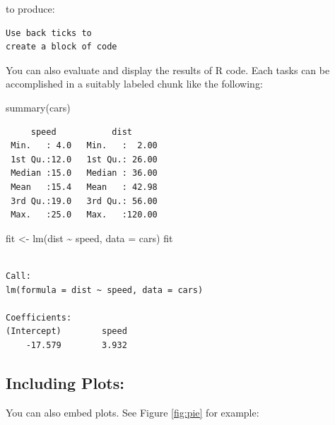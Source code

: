 \documentclass[
]{book}
\newenvironment{Shaded}{\begin{snugshade}}{\end{snugshade}}
\newcommand{\AttributeTok}[1]{\textcolor[rgb]{0.77,0.63,0.00}{#1}}
\newcommand{\FunctionTok}[1]{\textcolor[rgb]{0.00,0.00,0.00}{#1}}
\newcommand{\NormalTok}[1]{#1}
\newcommand{\OtherTok}[1]{\textcolor[rgb]{0.56,0.35,0.01}{#1}}
\newcommand{\SpecialCharTok}[1]{\textcolor[rgb]{0.00,0.00,0.00}{#1}}
\begin{document}
to produce:

\begin{verbatim}
Use back ticks to 
create a block of code
\end{verbatim}

You can also evaluate and display the results of R code. Each tasks can be accomplished in a suitably labeled chunk like the following:

\begin{Shaded}
\begin{Highlighting}[]
\FunctionTok{summary}\NormalTok{(cars)}
\end{Highlighting}
\end{Shaded}

\begin{verbatim}
     speed           dist       
 Min.   : 4.0   Min.   :  2.00  
 1st Qu.:12.0   1st Qu.: 26.00  
 Median :15.0   Median : 36.00  
 Mean   :15.4   Mean   : 42.98  
 3rd Qu.:19.0   3rd Qu.: 56.00  
 Max.   :25.0   Max.   :120.00  
\end{verbatim}

\begin{Shaded}
\begin{Highlighting}[]
\NormalTok{fit }\OtherTok{\textless{}{-}} \FunctionTok{lm}\NormalTok{(dist }\SpecialCharTok{\textasciitilde{}}\NormalTok{ speed, }\AttributeTok{data =}\NormalTok{ cars)}
\NormalTok{fit}
\end{Highlighting}
\end{Shaded}

\begin{verbatim}

Call:
lm(formula = dist ~ speed, data = cars)

Coefficients:
(Intercept)        speed  
    -17.579        3.932  
\end{verbatim}

\hypertarget{including-plots}{%
\subsection{Including Plots:}\label{including-plots}}

You can also embed plots. See Figure \ref{fig:pie} for example:
\end{document}
